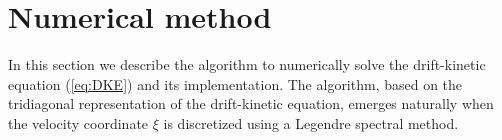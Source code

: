 \documentclass[10pt]{iopart}
\begin{document}


\section{Numerical method}
\label{sec:Algorithm}
 In this section we describe the algorithm to numerically solve the drift-kinetic equation (\ref{eq:DKE}) and its implementation. The algorithm, based on the tridiagonal representation of the drift-kinetic equation, emerges naturally when the velocity coordinate $\xi$ is discretized using a Legendre spectral method.
\end{document}
